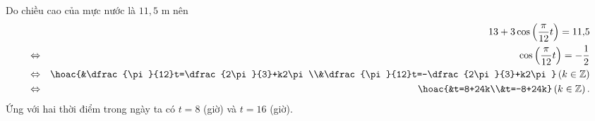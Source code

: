 \begin{ex}
{\begin{enumerate}
			 Do chiều cao của mực nước là $11{,}5$ m nên
			\begin{eqnarray*}
				&&13+3\cos \left( \dfrac{\pi }{12}t  \right) =11{,}5\\
				 &\Leftrightarrow& \cos \left( \dfrac{\pi }{12}t \right) =-\dfrac{1}{2}\\
				&\Leftrightarrow& \hoac{&\dfrac{\pi}{12}t=\dfrac{2\pi}{3}+k2\pi\\&\dfrac{\pi}{12}t=-\dfrac{2\pi}{3}+k2\pi}\left( k\in  \mathbb{Z} \right)\\
				&\Leftrightarrow& \hoac{&t=8+24k\\&t=-8+24k}\left(  k\in \mathbb{Z} \right).
			\end{eqnarray*}
			Ứng với hai thời  điểm trong ngày ta có $t=8$ (giờ) và $t=16$ (giờ).
		\end{enumerate}
	 }
\end{ex}

